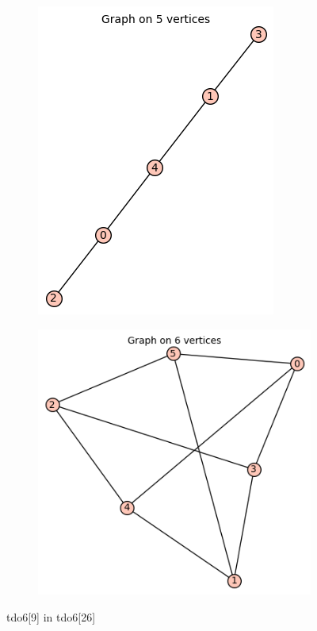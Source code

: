 \documentclass[12pt, a4paper]{article}
\begin{document}
\begin{center}
\begin{figure}[!htb]
\centering
\begin{subfigure}{0.5\textwidth}
  \centering
  \includegraphics[width=0.45\linewidth]{tdo6[9]}
\end{subfigure}%
\begin{subfigure}{0.5\textwidth}
  \centering
  \includegraphics[width=0.5\linewidth]{tdo6[26]}
\end{subfigure}
\caption{tdo6[9] in tdo6[26]}
\label{fig:test}
\end{figure}


\end{center}
\end{document}
